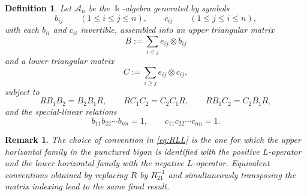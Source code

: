 \documentclass[11pt]{article}
\newtheorem{remark}[theorem]{Remark}
\newtheorem{definition}[theorem]{Definition}
\newcommand{\kk}{\Bbbk}
\begin{document}
\begin{definition}\label{def:An}
Let \(\mathcal A_n\) be the \(\kk\)-algebra generated by symbols
\[
b_{ij}\qquad (1\le i\le j\le n),\qquad
c_{ij}\qquad (1\le j\le i\le n),
\]
with each \(b_{ii}\) and \(c_{ii}\) invertible, assembled into an upper triangular matrix
\[
B:=\sum_{i\le j} e_{ij}\otimes b_{ij}
\]
and a lower triangular matrix
\[
C:=\sum_{i\ge j} e_{ij}\otimes c_{ij},
\]
subject to
\begin{equation}\label{eq:RLL}
RB_1B_2=B_2B_1R,\qquad
RC_1C_2=C_2C_1R,\qquad
RB_1C_2=C_2B_1R,
\end{equation}
and the special-linear relations
\begin{equation}\label{eq:det1}
b_{11}b_{22}\cdots b_{nn}=1,\qquad
c_{11}c_{22}\cdots c_{nn}=1.
\end{equation}
\end{definition}

\begin{remark}
The choice of convention in \eqref{eq:RLL} is the one for which the upper horizontal family
in the punctured bigon is identified with the positive \(L\)-operator and the lower horizontal family with the negative \(L\)-operator.
Equivalent conventions obtained by replacing \(R\) by \(R_{21}^{-1}\) and simultaneously transposing the matrix indexing lead to the same final result.
\end{remark}
\end{document}
